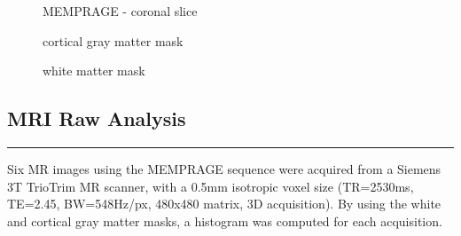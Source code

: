 \begin{figure}[!h]
            \begin{minipage}{0.17\linewidth}
                \centering MEMPRAGE - coronal slice
            \end{minipage}
            \begin{minipage}{0.17\linewidth}
                \centering cortical gray matter mask
            \end{minipage}
            \begin{minipage}{0.17\linewidth}
                \centering white matter mask
            \end{minipage}
            \vspace{-1cm}
    \end{figure}

\subsection*{MRI Raw Analysis}
	\vspace*{-0.5cm}\rule{5cm}{0.1mm}
	
	\Large{Six MR images using the MEMPRAGE sequence were acquired from a Siemens 3T TrioTrim MR scanner, with a 0.5mm isotropic voxel size (TR=2530ms, TE=2.45, BW=548Hz/px, 480x480 matrix, 3D acquisition). By using the white and cortical gray matter masks, a histogram was computed for each acquisition.} 
	
    \begin{figure}[!h]
        \centering
        \begin{minipage}{0.17\linewidth}
            
        \end{minipage}
        \begin{minipage}{0.17\linewidth}
            
        \end{minipage}
        \begin{minipage}{0.17\linewidth}
            
        \end{minipage}
        \begin{minipage}{0.17\linewidth}
            
        \end{minipage}
        \begin{minipage}{0.17\linewidth}
            
        \end{minipage}
        \vspace{-0.8cm}
    \end{figure}

